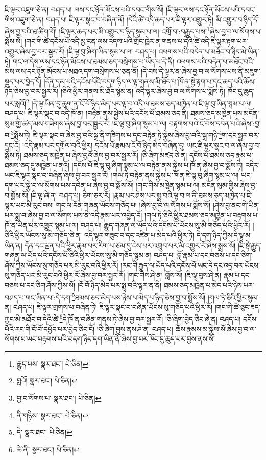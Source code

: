 ཇི་ལྟར་འཇུག་ཅེ་ན། བཤད་པ། ལས་དང་ཉོན་མོངས་པའི་དབང་གིས་སོ། །ཇི་ལྟར་ལས་དང་ཉོན་མོངས་པའི་དབང་གིས་འཇུག་ཅེ་ན། བཤད་པ། ཇི་ལྟར་སྣང་བ་བཞིན་ནོ། །དེའི་ཚེ་འདི་ཆད་པར་ཇི་ལྟར་འགྱུར་ཏེ། མི་འགྱུར་བ་ཉིད་དོ་ཞེས་བྱ་བའི་ཐ་ཚིག་གོ། །ཇི་ལྟར་ཆད་པར་མི་འགྱུར་བ་ཉིད་སྙམ་པ་ལ། འགྲོ་བ་:བརྒྱུད་པས་\footnote{རྒྱུད་པས་  སྣར་ཐང་།  པེ་ཅིན། }ཞེས་བྱ་བ་ལ་སོགས་པ་སྨོས་སོ། །གང་གི་ཚེ་དངོས་པོ་འདི་མྱ་ངན་ལས་འདས་པའི་གྲོང་ཁྱེར་ན་གནས་པ་དེའི་ཚེ་འདི་ཇི་ལྟར་རྟག་པར་འགྱུར་ཞེས་བྱ་བར་སྦྱར་རོ། །ཇི་ལྟ་བུ་ཞིག་ཡིན་སྙམ་པ་ལ། བཤད་པ། འཕགས་པའི་བདེན་པ་མཐོང་བ་ཉིད་མེ་ཡིན་ཏེ། གང་ལ་དེས་ལས་དང་ཉོན་མོངས་པ་ཐམས་ཅད་བསྲེགས་པ་ཡོད་པ་དེ་ནི། འཕགས་པའི་བདེན་པ་མཐོང་བའི་མེས་ལས་དང་ཉོན་མོངས་པ་མཐའ་དག་བསྲེགས་པ་ཅན་ནོ། །དེ་བས་དེ་ལྟར་ན་ཞེས་བྱ་བ་ལ་སོགས་པས་ནི་མཇུག་སྡུད་པར་བྱེད་དོ། །དོན་དམ་པའི་དངོས་པོའི་བདག་ཉིད་ལ་ལྟ་གནས་མི་ཐོད་པ་ཁོ་ན་སྟེ་རྟག་པ་དང་ཆད་པའི་ཆོས་ཉིད་ཅེས་བྱ་བར་སྦྱར་རོ། །ཅིའི་ཕྱིར་གནས་མི་ཐོད་སྙམ་ན། འདི་ལྟར་ཞེས་བྱ་བ་ལ་སོགས་པ་སྨོས་ཏེ། ཁོང་དུ་ཆུད་པར་སླའོ།\footnote{བླའོ།  སྣར་ཐང་།  པེ་ཅིན། } །དེ་ལྟ་ཡིན་དུ་ཆུག་ན་ངོ་བོ་ཉིད་མེད་པར་ལྟ་བ་འདི་ལ་ཐམས་ཅད་མཁྱེན་པ་ཇི་ལྟ་བུ་ཡིན་སྙམ་པ་ལ། བཤད་པ། ཇི་ལྟར་སྣང་བ་འདི་ཁོ་ན། །བརྟེན་ནས་སྐྱེས་པའི་དངོས་པོ་ཐམས་ཅད་ནི། ཐམས་ཅད་མཁྱེན་པས་མངོན་སུམ་གྱི་ཚད་མས་གཟིགས་ཞེས་བྱ་བར་སྦྱར་རོ། །ཇི་ལྟ་བུ་ཞིག་སྙམ་པ་ལ། བརྟགས་པའི་ངོ་བོས་དབེན་པའི་ཞེས་:བྱ་བ་\footnote{བྱ་བ་སོགས་པ་  སྣར་ཐང་།  པེ་ཅིན། }སྨོས་ཏེ། ཇི་ལྟར་སྣང་བ་ཞེས་བྱ་བའི་སྒྲ་ནི་གཟིགས་པ་དང་བརྟེན་ཏེ་སྐྱེས་ཞེས་བྱ་བའི་སྒྲ་གཉི་\footnote{ནི་གཉིས་  སྣར་ཐང་།  པེ་ཅིན། }ག་དང་སྦྱར་བར་དྲང་ངོ། །འདི་རྣམ་པར་དགྲོལ་བའི་ཕྱིར། དངོས་པོ་རྣམས་ངོ་བོ་ཉིད་མེད་བཞིན་དུ། ཡང་ཇི་ལྟར་སྣང་བ་ལ་ཞེས་བྱ་བ་སྨོས་ཏེ། ཐམས་ཅད་མཁྱེན་པ་ཞེས་བྱའོ་ཞེས་བྱ་བར་སྦྱར་རོ། །ཅི་ཞིག་མཛད་ཅེ་ན། དངོས་པོ་ཐམས་ཅད་རྣམ་པ་ཐམས་ཅད་དུ་མཁྱེན་པ་ནའོ། །དངོས་པོ་ཇི་ལྟ་བུ་ཞིག་སྙམ་པ་ལ་བརྟེན་ནས་སྐྱེས་པ་ཁོ་ན་ཞེས་བྱ་བ་སྨོས་ཏེ། འདིར་ཡང་ཇི་ལྟར་སྣང་བ་བཞིན་ཞེས་བྱ་བར་སྦྱར་རོ། །གལ་ཏེ་བརྟེན་ནས་སྐྱེས་པ་ཁོ་ན་ཇི་ལྟ་བུ་ཞིག་སྙམ་པ་ལ། ཡང་དག་པར་སྐྱེ་བ་ལ་སོགས་པས་དབེན་པ་ཞེས་བྱ་བ་སྨོས་སོ། །གང་གིས་མཁྱེན་སྙམ་པ་ལ། མངོན་སུམ་གྱིས་ཞེས་བྱ་བ་སྨོས་སོ། །ཇི་ལྟ་ཞེ་ན། བཤད་པ། ཅིག་ཅར་རོ། །རྣམ་པར་ཤེས་པར་སྨྲ་བའི་ལྟ་བ་ལ་ནི་ཐམས་ཅད་མཁྱེན་པ་ཇི་ལྟར་ཡང་མི་རུང་བས། གང་ལ་དོན་གཞན་ཡོངས་གཅོད་པ། །ཞེས་བྱ་བ་ལ་སོགས་པ་སྨོས་སོ། །ཤེས་བྱ་ནང་གི་ཡིན་པར་སྨྲ་བ་ཞེས་བྱ་བ་ལ་སོགས་པས་ནི་འདི་རྣམ་པར་འབྱེད་དོ། །གལ་ཏེ་ཅིའི་ཕྱིར་ཐམས་ཅད་མཁྱེན་པ་བརྟགས་པ་ཁོ་ན་ཡིན་པར་འགྱུར་སྙམ་པ་ལ། བཤད་པ། རྒྱུད་གཞན་ལ་ཡོད་པའི་དངོས་པོ་ཡོངས་སུ་མི་གཅོད་པའི་ཕྱིར་རོ། །ཅིའི་ཕྱིར་ཡོངས་སུ་མི་གཅོད་ཅེ་ན། འདི་ལྟར་གཟུང་བ་དང་འཛིན་པ་མེད་པའི་ཕྱིར་ཏེ། དེ་དག་ཉིད་ཀྱིས་དེ་ལྟ་མ་ཡིན་ན། དོན་དང་ལྡན་པའི་ཕྱིར་རྣམ་པར་རིག་པ་ཙམ་དུ་ངེས་པར་འགྲུབ་པར་མི་འགྱུར་རོ་ཞེས་སྨྲས་སོ། །ཇི་སྟེ་རྒྱུད་གཞན་ལ་ཡོད་པའི་དངོས་པོ་ཅིའི་ཕྱིར་ཡོངས་སུ་མི་གཅོད་སྙམ་ན། བཤད་པ། བློ་རྣམ་པ་དང་བཅས་པ་དང་ཅིག་ཤོས་ཀྱིས་ཡོངས་སུ་གཅོད་པར་མི་རུང་བའི་ཕྱིར་རོ། །རང་གི་རྒྱུད་ལ་ཡོད་པའི་དངོས་པོ་ཡང་དེ་དང་འདྲ་བར་ཡོངས་སུ་གཅོད་པར་མི་རུང་བའི་ཕྱིར་རོ་ཞེས་བྱ་བར་སྦྱར་རོ། །གང་གིས་ཤེ་ན། བློས་སོ། །ཇི་ལྟ་བུས་ཤེ་ན། རྣམ་པ་དང་བཅས་པ་དང་ཅིག་ཤོས་ཀྱིས་སོ། །ངོ་བོ་ཉིད་མེད་པར་སྨྲ་བའི་ལྟར་ན་ནི། ཐམས་ཅད་མཁྱེན་པ་མེད་པའི་ཉེས་པར་བཤད་པ་གང་ཡིན་པ་:དེ་དག་\footnote{དེ་  སྣར་ཐང་།  པེ་ཅིན། }ཐམས་ཅད་མེད་པས་ཉེས་པ་མེད་པ་ཉིད་ཅེས་བྱ་བ་སྨོས་སོ། །གལ་ཏེ་ཅིའི་ཕྱིར་སྙམ་ན། བཤད་པ། ཇི་ལྟར་གྲགས་པ་བཞིན་ཏེ། ཇི་ལྟར་སྣང་བ་བཞིན་ཡོངས་སུ་གཅོད་པའི་ཕྱིར་རོ། །གང་གི་ཚེ་ཅུང་ཟད་ཀྱང་མི་མཐོང་བ་དེའི་ཚེ་\footnote{ཚེ་ནི་  སྣར་ཐང་།  པེ་ཅིན། }དེ་ཁོ་ན་བཞིན་གནས་ཏེ་ཞེས་བྱ་བར་སྦྱར་རོ། །ཅི་ཞིག་བྱེད་ཅིང་ཞེ་ན། བཤད་པ། དངོས་པོའི་རང་གི་ངོ་བོ་དཔྱོད་པར་བྱེད་ཅིང་ངོ། །ཅི་ཞིག་བྱས་ནས་ཤེ་ན། བཤད་པ། ཆོས་རྣམས་མ་སྐྱེས་སོ་ཞེས་བྱ་བ་ལ་སོགས་པ་ཡང་བརྟགས་པའི་བདག་ཉིད་དག་ཡིན་ནོ་ཞེས་བྱ་བར་ཁོང་དུ་ཆུད་པར་བྱས་ནས་སོ། 